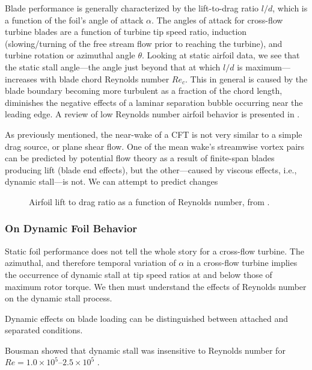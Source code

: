 \documentclass[energies,article,accept,moreauthors,pdftex,12pt,a4paper]{mdpi}
\begin{document}
Blade performance is generally characterized by the lift-to-drag ratio $l/d$,
which is a function of the foil's angle of attack $\alpha$. The angles of attack
for cross-flow turbine blades are a function of turbine tip speed ratio,
induction (slowing/turning of the free stream flow prior to reaching the
turbine), and turbine rotation or azimuthal angle $\theta$. Looking at static
airfoil data, we see that the static stall angle---the angle just beyond that at
which $l/d$ is maximum---increases with blade chord Reynolds number $Re_c$. This
in general is caused by the blade boundary becoming more turbulent as a fraction
of the chord length, diminishes the negative effects of a laminar separation
bubble occurring near the leading edge. A review of low Reynolds number airfoil
behavior is presented in \cite{Lissaman1983}.

As previously mentioned, the near-wake of a CFT is not very similar to a simple
drag source, or plane shear flow. One of the mean wake's streamwise vortex pairs
can be predicted by potential flow theory as a result of finite-span blades
producing lift (blade end effects), but the other---caused by viscous effects,
i.e., dynamic stall---is not. We can attempt to predict changes

\begin{figure}[ht]
\caption{Airfoil lift to drag ratio as a function of Reynolds number, from 
\cite{McMasters1980}.}
\end{figure}

\subsubsection{On Dynamic Foil Behavior}

Static foil performance does not tell the whole story for a cross-flow turbine.
The azimuthal, and therefore temporal variation of $\alpha$ in a cross-flow
turbine implies the occurrence of dynamic stall at tip speed ratios at and below
those of maximum rotor torque\cite{Para2002}. We then must understand the
effects of Reynolds number on the dynamic stall process.

Dynamic effects on blade loading can be distinguished between attached and
separated conditions. 

Bousman showed that dynamic stall was insensitive to Reynolds number for $Re=1.0
\times 10^5$--$2.5 \times 10^5$ \cite{Bousman2000-evaluation}.
\end{document}
